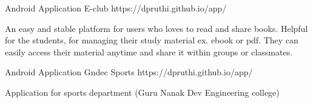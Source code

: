 \begin{cventries}

\cventry
{Android Application}%
{E-club} 
{https://dpruthi.github.io/app/ } %
{ } %
{ \begin{cvitems}
\item {An easy and stable platform for users who loves to read and share books. Helpful for the students, for managing their study material ex. ebook or pdf. They can easily access their material anytime and share it within groups or classmates.}\end{cvitems}
}

\cventry
{Android Application} %
{Gndec Sports} %
{https://dpruthi.github.io/app/} %
{ } %
{ \begin{cvitems}
\item  {Application for sports department (Guru Nanak Dev Engineering college)}\end{cvitems}
}
 
 
\end{cventries}